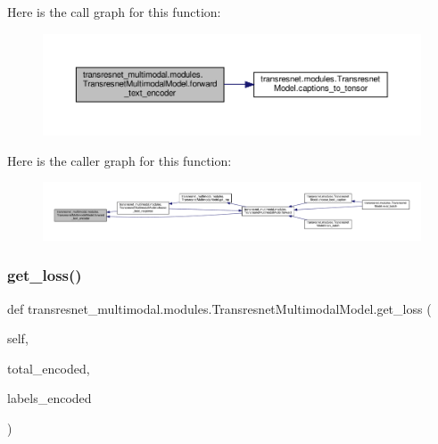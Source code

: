 Here is the call graph for this function\+:
\nopagebreak
\begin{figure}[H]
\begin{center}
\leavevmode
\includegraphics[width=350pt]{classtransresnet__multimodal_1_1modules_1_1TransresnetMultimodalModel_a0891aec01eb1a1bafb5b291296581e25_cgraph}
\end{center}
\end{figure}
Here is the caller graph for this function\+:
\nopagebreak
\begin{figure}[H]
\begin{center}
\leavevmode
\includegraphics[width=350pt]{classtransresnet__multimodal_1_1modules_1_1TransresnetMultimodalModel_a0891aec01eb1a1bafb5b291296581e25_icgraph}
\end{center}
\end{figure}
\mbox{\label{classtransresnet__multimodal_1_1modules_1_1TransresnetMultimodalModel_affb7977abac6a4671c8d31456345fb58}} 
\subsubsection{\texorpdfstring{get\+\_\+loss()}{get\_loss()}}
{\footnotesize\ttfamily def transresnet\+\_\+multimodal.\+modules.\+Transresnet\+Multimodal\+Model.\+get\+\_\+loss (\begin{DoxyParamCaption}\item[{}]{self,  }\item[{}]{total\+\_\+encoded,  }\item[{}]{labels\+\_\+encoded }\end{DoxyParamCaption})}

